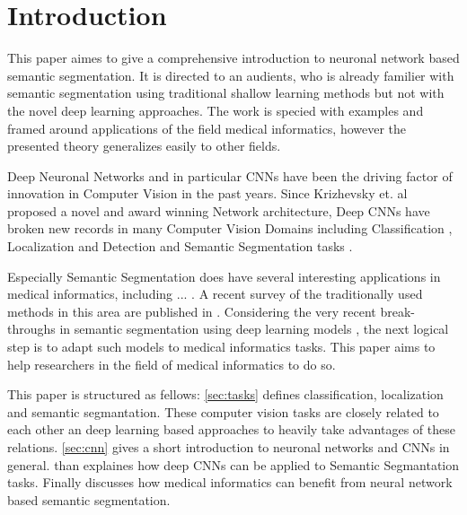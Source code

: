 \section{Introduction}\label{sec:introduction}

This paper aimes to give a comprehensive introduction to neuronal network based semantic segmentation. It is directed to an audients, who is already familier with semantic segmentation using traditional shallow learning methods but not with the novel deep learning approaches. The work is specied with examples and framed around applications of the field medical informatics, however the presented theory generalizes easily to other fields. 

Deep Neuronal Networks and in particular \glspl{CNN} have been the driving factor of innovation in Computer Vision in the past years. Since Krizhevsky et. al \cite{AlexNet} proposed a novel and award winning Network architecture, Deep \glspl{CNN} have broken new records in many Computer Vision Domains including Classification \cite{AlexNet,VGG16,googLeNeT}, Localization and Detection \cite{RNN,overfeat} and Semantic Segmentation tasks \cite{fcn,CRF1,googleSeg}. 

Especially Semantic Segmentation does have several interesting applications in medical informatics, including ... . A recent survey of the traditionally used methods in this area are published in \cite{Martin}. Considering the very recent break-throughs in semantic segmentation using deep learning models \cite{fcn,CRF1}, the next logical step is to adapt such models to medical informatics tasks. This paper aims to help researchers in the field of medical informatics to do so. 

\iffalse

To archive that we will give a comprehensive introduction to neuronal network based semantic segmentation. As neuronal network based semantic segmentation is a very new method and most researches in the medical informatics community have little of new experience with these models. Additionally we are giving a short overview over neuronal network based semantic segmantation approaches already applied in medical informatics. Lastly we do a short case study on how the proposed method can be applied to a medical informatic task in the domain of computer assisted surgery.

\fi

This paper is structured as fellows: \cref{sec:tasks} defines classification, localization and semantic segmantation. These computer vision tasks are closely related to each other an deep learning based approaches to heavily take advantages of these relations. \cref{sec:cnn} gives a short introduction to neuronal networks and \glspl{CNN} in general.  than explaines how deep \glspl{CNN} can be applied to Semantic Segmantation tasks. Finally  discusses how medical informatics can benefit from neural network based semantic segmentation.


